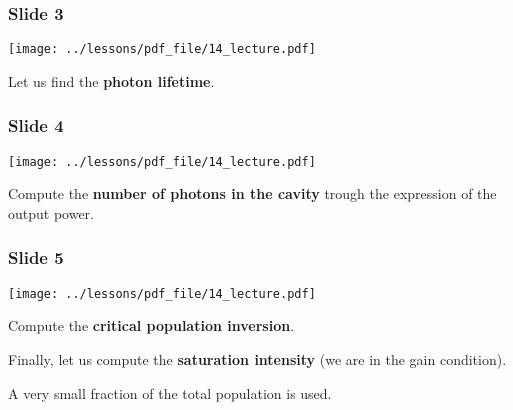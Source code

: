 \documentclass[../main/main.tex]{subfiles}
\begin{document}
\subsubsection*{Slide 3}

\begin{minipage}[]{0.5\linewidth}
\centering
\texttt{[image: ../lessons/pdf\_file/14\_lecture.pdf]}
\end{minipage}
\hspace{0.3cm}\vspace{0.3cm}
\begin{minipage}[c]{0.47\linewidth}

Let us find the \textbf{photon lifetime}.

\end{minipage}

\newpage

\subsubsection*{Slide 4}

\begin{minipage}[]{0.5\linewidth}
\centering
\texttt{[image: ../lessons/pdf\_file/14\_lecture.pdf]}
\end{minipage}
\hspace{0.3cm}\vspace{0.3cm}
\begin{minipage}[c]{0.47\linewidth}

Compute the \textbf{number of photons in the cavity} trough the expression of the output power.

\end{minipage}

\subsubsection*{Slide 5}

\begin{minipage}[]{0.5\linewidth}
\centering
\texttt{[image: ../lessons/pdf\_file/14\_lecture.pdf]}
\end{minipage}
\hspace{0.3cm}\vspace{0.3cm}
\begin{minipage}[c]{0.47\linewidth}

Compute the \textbf{critical population inversion}.

Finally, let us compute the \textbf{saturation intensity} (we are in the gain condition).

A very small fraction of the total population is used.

\end{minipage}
\end{document}
